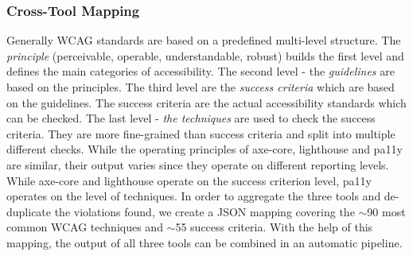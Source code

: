\subsubsection{Cross-Tool Mapping}
Generally WCAG standards are based on a predefined multi-level structure. The 
\textit{principle} (perceivable, operable, understandable, robust) builds the first level 
and defines the main categories of accessibility. The second level - the 
\textit{guidelines} are based on the principles. The third level are the \textit{success
criteria} which are based on the guidelines. The success criteria are the
actual accessibility standards which can be checked. The last level - \textit{the 
techniques} are used to check the success criteria. They are more fine-grained
than success criteria and split into multiple different checks.\newline
While the operating principles of axe-core, lighthouse and pa11y are similar, their 
output varies since they operate on different reporting levels. While 
axe-core and lighthouse operate on the success criterion level, pa11y operates 
on the level of techniques. In order to aggregate the three tools 
and de-duplicate the violations found, we create a JSON mapping covering the $\sim$90 most
common WCAG techniques and $\sim$55 success criteria. 
With the help of this mapping, the output of all three tools can be combined in an 
automatic pipeline.

